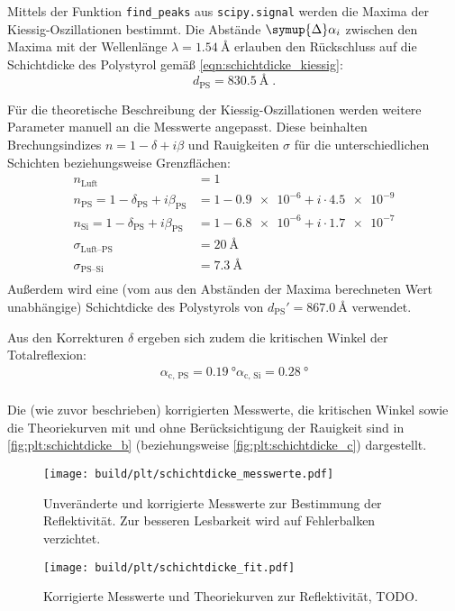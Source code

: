 Mittels der Funktion \texttt{find\_peaks} aus \texttt{scipy.signal} werden die Maxima der Kiessig-Oszillationen bestimmt.
Die Abstände $\symup{\Delta} \alpha_i$ zwischen den Maxima
mit der Wellenlänge $\lambda = \SI{1.54}{\angstrom}$
erlauben den Rückschluss auf die Schichtdicke des Polystyrol gemäß \autoref{eqn:schichtdicke_kiessig}:
\[
    d_\text{PS} = \SI{830.5}{\angstrom} \; .
\]

Für die theoretische Beschreibung der Kiessig-Oszillationen werden weitere Parameter manuell an die Messwerte angepasst.
Diese beinhalten Brechungsindizes $n = 1 - \delta + i\beta$ und Rauigkeiten $\sigma$
für die unterschiedlichen Schichten beziehungsweise Grenzflächen:
\begin{align*}
    n_\text{Luft} &= 1 \\
    n_\text{PS} = 1 - \delta_\text{PS} + i \beta_\text{PS} &= 1 - \num{0.9e-6} + i \cdot \num{4.5e-9} \\
    n_\text{Si} = 1 - \delta_\text{PS} + i \beta_\text{PS} &= 1 - \num{6.8e-6} + i \cdot \num{1.7e-7} \\
    \sigma_\text{Luft–PS} &= \SI{20}{\angstrom} \\
    \sigma_\text{PS–Si} &= \SI{7.3}{\angstrom} \\
\end{align*}
Außerdem wird eine (vom aus den Abständen der Maxima berechneten Wert unabhängige) Schichtdicke des Polystyrols von
$d_\text{PS}' = \SI{867.0}{\angstrom}$ verwendet.

Aus den Korrekturen $\delta$ ergeben sich zudem die kritischen Winkel der Totalreflexion:
\begin{align*}
    \alpha_\text{c, PS} = \SI{0.19}{\degree}
    \alpha_\text{c, Si} = \SI{0.28}{\degree} \\
\end{align*}

Die (wie zuvor beschrieben) korrigierten Messwerte,
die kritischen Winkel
sowie die Theoriekurven mit und ohne Berücksichtigung der Rauigkeit
sind in \autoref{fig:plt:schichtdicke_b}
    (beziehungsweise \autoref{fig:plt:schichtdicke_c})
dargestellt.


\begin{figure}
    \centering
    \texttt{[image: build/plt/schichtdicke\_messwerte.pdf]}
    \caption{
        Unveränderte und korrigierte Messwerte zur Bestimmung der Reflektivität.
        Zur besseren Lesbarkeit wird auf Fehlerbalken verzichtet.
    }
    \label{fig:plt:schichtdicke_a}
\end{figure}
\begin{figure}
    \centering
    \texttt{[image: build/plt/schichtdicke\_fit.pdf]}
    \caption{
        Korrigierte Messwerte und Theoriekurven zur Reflektivität, TODO.
    }
    \label{fig:plt:schichtdicke_b}
\end{figure}

